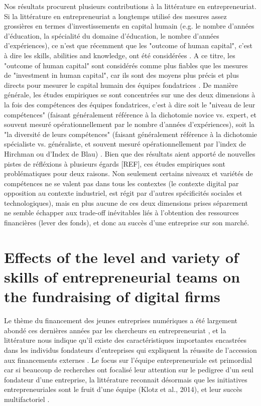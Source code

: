 \documentclass[12pt]{article}
\begin{document}
Nos résultats procurent plusieurs contributions à la littérature en entrepreneuriat. Si la littérature en entrepreneuriat a longtemps utilisé des mesures assez grossières en termes d'investissements en capital humain (e.g. le nombre d'années d'éducation, la spécialité du domaine d'éducation, le nombre d'années d'expériences), ce n'est que récemment que les "outcome of human capital", c'est à dire les skills, abilities and knowledge, ont été considérées \citep{marvel2016human}. A ce titre, les "outcome of human capital" sont considérés comme plus fiables que les mesures de "investment in human capital", car ils sont des moyens plus précis et plus directs pour mesurer le capital humain des équipes fondatrices \citep{unger2011human}. De manière générale, les études empiriques se sont concentrées sur une des deux dimensions à la fois des compétences des équipes fondatrices, c'est à dire soit le "niveau de leur compétences" (faisant généralement référence à la dichotomie novice vs. expert, et souvent mesuré opérationnellement par le nombre d'années d'expériences), soit la "la diversité de leurs compétences" (faisant généralement référence à la dichotomie spécialiste vs. généraliste, et souvent mesuré opérationnellement par l'index de Hirchman ou d'Index de Blau) \citep{harrison2007s}. Bien que des résultats aient apporté de nouvelles pistes de réfléxions à plusieurs égards [REF], ces études empiriques sont problématiques pour deux raisons. Non seulement certains niveaux et variétés de compétences ne se valent pas dans tous les contextes (le contexte digital par opposition au contexte industriel, est régit par d'autres spécificités sociales et technologiques), mais en plus aucune de ces deux dimensions prises séparement ne semble échapper aux trade-off inévitables liés à l'obtention des ressources financières (lever des fonds), et donc au succès d'une entreprise sur son marché.

\section{Effects of the level and variety of skills of entrepreneurial teams on the fundraising of digital firms}

Le thème du financement des jeunes entreprises numériques a été largement abondé ces dernières années par les chercheurs en entrepreneuriat \citep{klein2020start}, et la littérature nous indique qu'il existe des caractéristiques importantes encastrées dans les individus fondateurs d'entreprises qui expliquent la réussite de l'accession aux financements externes \citep{pinelli2020too, reese2020should}. Le focus sur l'équipe entrepreneuriale est primordial car si beaucoup de recherches ont focalisé leur attention sur le pedigree d'un seul fondateur d'une entreprise, la littérature reconnait désormais que les initiatives entrepreneuriales sont le fruit d'une équipe (Klotz et al., 2014), et leur succès multifactoriel \citep{roure1990predictors}.
\end{document}
